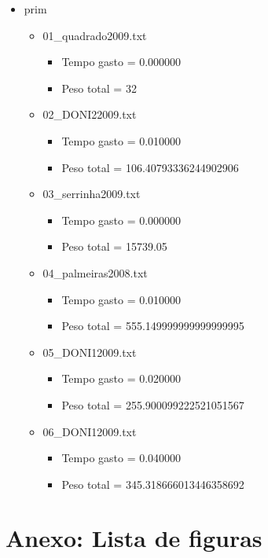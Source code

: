 \documentclass[12pt,a4paper]{article}
\begin{document}
\begin{itemize}
\begin{itemize}
\end{itemize}
\item prim 
\begin{itemize}
\item 01\_quadrado2009.txt
\begin{itemize}
\item Tempo gasto = 0.000000 
\item Peso total = 32
\end{itemize}
\item 02\_DONI22009.txt
\begin{itemize}
\item Tempo gasto = 0.010000 
\item Peso total = 106.40793336244902906 
\end{itemize}
\item 03\_serrinha2009.txt
\begin{itemize}
\item Tempo gasto = 0.000000 
\item Peso total = 15739.05 
\end{itemize}
\item 04\_palmeiras2008.txt
\begin{itemize}
\item Tempo gasto = 0.010000 
\item Peso total = 555.149999999999999995 
\end{itemize}
\item 05\_DONI12009.txt
\begin{itemize}
\item Tempo gasto = 0.020000 
\item Peso total = 255.900099222521051567 
\end{itemize}
\item 06\_DONI12009.txt
\begin{itemize}
\item Tempo gasto = 0.040000 
\item Peso total = 345.318666013446358692 
\end{itemize}
\end{itemize}
\end{itemize}

%
%



\section{Anexo: Lista de figuras}

\end{document}
